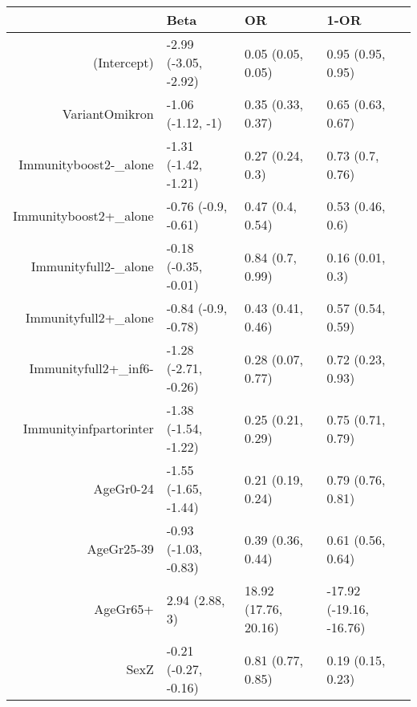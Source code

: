 \begin{table}[ht]
\centering
\begin{tabular}{rlll}
  \hline
 & Beta & OR & 1-OR \\ 
  \hline
(Intercept) & -2.99 (-3.05, -2.92) & 0.05 (0.05, 0.05) & 0.95 (0.95, 0.95) \\ 
  VariantOmikron & -1.06 (-1.12, -1) & 0.35 (0.33, 0.37) & 0.65 (0.63, 0.67) \\ 
  Immunityboost2-\_alone & -1.31 (-1.42, -1.21) & 0.27 (0.24, 0.3) & 0.73 (0.7, 0.76) \\ 
  Immunityboost2+\_alone & -0.76 (-0.9, -0.61) & 0.47 (0.4, 0.54) & 0.53 (0.46, 0.6) \\ 
  Immunityfull2-\_alone & -0.18 (-0.35, -0.01) & 0.84 (0.7, 0.99) & 0.16 (0.01, 0.3) \\ 
  Immunityfull2+\_alone & -0.84 (-0.9, -0.78) & 0.43 (0.41, 0.46) & 0.57 (0.54, 0.59) \\ 
  Immunityfull2+\_inf6- & -1.28 (-2.71, -0.26) & 0.28 (0.07, 0.77) & 0.72 (0.23, 0.93) \\ 
  Immunityinfpartorinter & -1.38 (-1.54, -1.22) & 0.25 (0.21, 0.29) & 0.75 (0.71, 0.79) \\ 
  AgeGr0-24 & -1.55 (-1.65, -1.44) & 0.21 (0.19, 0.24) & 0.79 (0.76, 0.81) \\ 
  AgeGr25-39 & -0.93 (-1.03, -0.83) & 0.39 (0.36, 0.44) & 0.61 (0.56, 0.64) \\ 
  AgeGr65+ & 2.94 (2.88, 3) & 18.92 (17.76, 20.16) & -17.92 (-19.16, -16.76) \\ 
  SexZ & -0.21 (-0.27, -0.16) & 0.81 (0.77, 0.85) & 0.19 (0.15, 0.23) \\ 
   \hline
\end{tabular}
\end{table}
